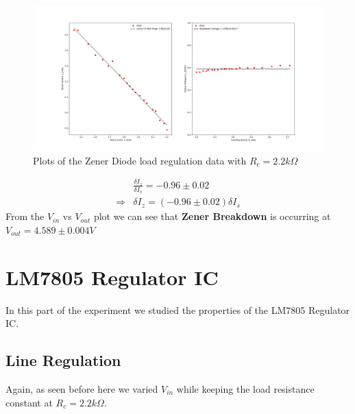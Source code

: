 \documentclass[10pt]{scrartcl}
\theoremstyle{definition}
\begin{document}
\begin{figure}[!h]
    \centering
    \includegraphics[width=\linewidth]{withrc.png}
    \caption{Plots of the Zener Diode load regulation data with $R_c = 2.2 k\Omega$}
\end{figure}
\begin{align*}
    &\frac{\delta{I_z}}{\delta{I_s}} = -0.96 \pm 0.02 \\ 
    \Rightarrow &\boxed{\delta{I_z} = (-0.96 \pm 0.02)\delta{I_s}}
\end{align*}
From the $V_{in}$ vs $V_{out}$ plot we can see that \textbf{Zener Breakdown} is occurring at $\boxed{V_{out} = 4.589 \pm 0.004 V}$
\clearpage
\section{LM7805 Regulator IC}
In this part of the experiment we studied the properties of the LM7805 Regulator IC.
\subsection{Line Regulation}
Again, as seen before here we varied $V_{in}$ while keeping the load resistance constant at $R_c = 2.2 k\Omega$.
\end{document}
